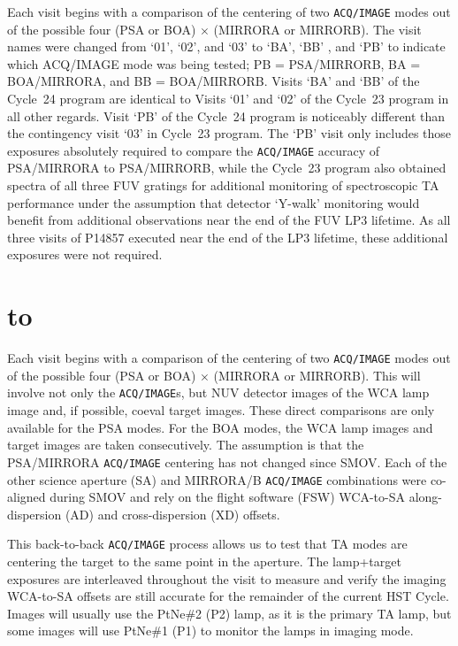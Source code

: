 \documentclass[12pt]{reportj}
\newcommand{\pid}[1]{{\rm P}#1}
\newcommand{\tacq}[1]{\texttt{ACQ/#1}}
\def\ssection#1{\addtocounter{section}{1} \setcounter{subsection}{0} \section*{\hbox to \hsize{\large\bf \arabic{section}. #1\hfill }}}
\begin{document}
Each visit begins with a comparison of the centering of two \tacq{IMAGE} modes out of the possible four (PSA or BOA) $\times$ (MIRRORA or MIRRORB). The visit names were changed from `01', `02', and `03' to `BA', `BB' , and `PB' to indicate which ACQ/IMAGE mode was being tested; PB = PSA/MIRRORB, BA = BOA/MIRRORA, and BB = BOA/MIRRORB. Visits `BA' and `BB' of the Cycle~24 program are identical to Visits `01' and `02' of the Cycle~23 program in all other regards.
Visit `PB' of the Cycle~24 program is noticeably different than the contingency visit `03' in Cycle~23 program. The `PB' visit only includes those exposures absolutely required to compare the \tacq{IMAGE} accuracy of PSA/MIRRORA to PSA/MIRRORB, while the Cycle~23 program also obtained spectra of all three FUV gratings for additional monitoring of spectroscopic TA performance under the assumption that detector `Y-walk' monitoring would benefit from additional observations near the end of the FUV LP3 lifetime. As all three visits of \pid{14857} executed near the end of the LP3 lifetime, these additional exposures were not required.
\clearpage
\ssection{Program Structure \label{sec:structure}}
Each visit begins with a comparison of the centering of two \tacq{IMAGE} modes out of the possible four (PSA or BOA) $\times$ (MIRRORA or MIRRORB). This will involve not only the \tacq{IMAGE}s, but NUV detector images of the WCA lamp image and, if possible, coeval target images. These direct comparisons are only available for the PSA modes. For the BOA modes, the WCA lamp images and target images are taken consecutively. The assumption is that the PSA/MIRRORA \tacq{IMAGE} centering has not changed since SMOV. Each of the other science aperture (SA) and MIRRORA/B \tacq{IMAGE}  combinations were co-aligned during SMOV and rely on the flight software
(FSW) WCA-to-SA along-dispersion (AD) and cross-dispersion (XD) offsets.

This back-to-back \tacq{IMAGE}  process allows us to test that TA modes are centering the target to the same point in the aperture. The lamp+target exposures are interleaved throughout the visit to measure and verify the imaging WCA-to-SA offsets are still accurate for the remainder of the current HST Cycle. Images will usually use the PtNe\#2 (P2) lamp, as it is the primary TA lamp, but some images will use PtNe\#1 (P1) to monitor the lamps in imaging mode.
\end{document}
